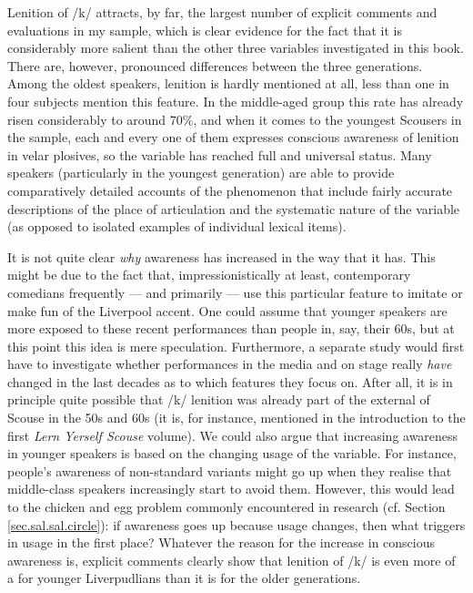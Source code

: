 Lenition of /k/ attracts, by far, the largest number of explicit comments and evaluations in my sample, which is clear evidence for the fact that it is considerably more salient than the other three variables investigated in this book.
There are, however, pronounced differences between the three generations.
Among the oldest speakers, lenition is hardly mentioned at all, less than one in four subjects mention this feature.
In the middle-aged group this rate has already risen considerably to around 70\%, and when it comes to the youngest Scousers in the sample, each and every one of them expresses conscious awareness of lenition in velar plosives, so the variable has reached full and universal  status.
Many speakers (particularly in the youngest generation) are able to provide comparatively detailed accounts of the phenomenon that include fairly accurate descriptions of the place of articulation and the systematic nature of the variable (as opposed to isolated examples of individual lexical items).

It is not quite clear \emph{why} awareness has increased in the way that it has.
This might be due to the fact that, impressionistically at least, contemporary comedians frequently --- and primarily --- use this particular feature to imitate or make fun of the Liverpool accent.
One could assume that younger speakers are more exposed to these recent performances than people in, say, their 60s, but at this point this idea is mere speculation.
Furthermore, a separate study would first have to investigate whether performances in the media and on stage really \emph{have} changed in the last decades as to which features they focus on.
After all, it is in principle quite possible that /k/ lenition was already part of the external  of Scouse in the 50s and 60s (it is, for instance, mentioned in the introduction to the first \emph{Lern Yerself Scouse} volume).
We could also argue that increasing awareness in younger speakers is based on the changing usage of the variable.
For instance, people's awareness of non-standard variants might go up when they realise that middle-class speakers increasingly start to avoid them.
However, this would lead to the chicken and egg problem commonly encountered in  research (cf. Section \ref{sec.sal.sal.circle}): if awareness goes up because usage changes, then what triggers  in usage in the first place?
Whatever the reason for the increase in conscious awareness is, explicit comments clearly show that lenition of /k/ is even more of a  for younger Liverpudlians than it is for the older generations.

